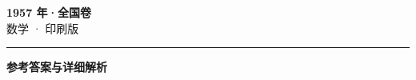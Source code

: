 \documentclass[zihao=5, a4paper]{ctexart}
\begin{document}
\begin{center}
  {\Large\bfseries 1957 年·全国卷}\\[4pt]
  {\large 数学 · 印刷版}
\end{center}
\medskip
{}

\par\bigskip\hrule\bigskip
{}
\begin{center}{\large\bfseries 参考答案与详细解析}\end{center}
\smallskip

\end{document}
